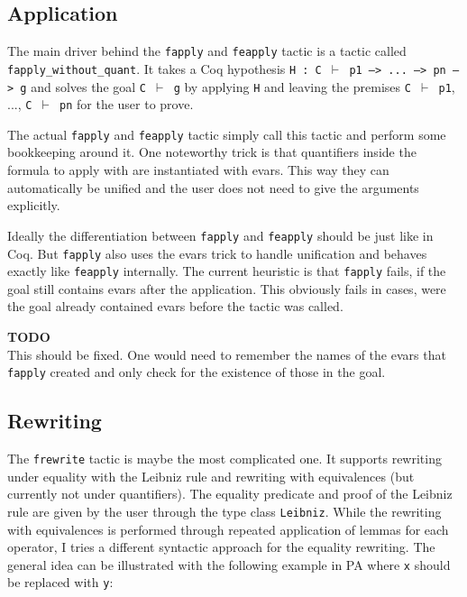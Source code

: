 \documentclass[12pt, a4paper]{article}
\newcommand{\improve}[1]{
	\vspace{3pt}
	\begin{boximprove}
		\parbox{\textwidth}{\textcolor{colorimprove}{\textbf{TODO}\\#1}}
	\end{boximprove}}
\begin{document}
\subsection{Application}

The main driver behind the \texttt{fapply} and \texttt{feapply} tactic is a tactic called \texttt{fapply\_without\_quant}.
It takes a Coq hypothesis \texttt{H : C $\vdash$ p1 --> ... --> pn --> g} and solves the goal \texttt{C $\vdash$ g} by applying \texttt{H} and leaving the premises \texttt{C $\vdash$ p1}, ..., \texttt{C $\vdash$ pn} for the user to prove.

The actual \texttt{fapply} and \texttt{feapply} tactic simply call this tactic and perform some bookkeeping around it.
One noteworthy trick is that quantifiers inside the formula to apply with are instantiated with evars.
This way they can automatically be unified and the user does not need to give the arguments explicitly.

\medskip\noindent
Ideally the differentiation between \texttt{fapply} and \texttt{feapply} should be just like in Coq.
But \texttt{fapply} also uses the evars trick to handle unification and behaves exactly like \texttt{feapply} internally.
The current heuristic is that \texttt{fapply} fails, if the goal still contains evars after the application.
This obviously fails in cases, were the goal already contained evars before the tactic was called.

\improve{This should be fixed. One would need to remember the names of the evars that \texttt{fapply} created and only check for the existence of those in the goal.}

\subsection{Rewriting}

The \texttt{frewrite} tactic is maybe the most complicated one.
It supports rewriting under equality with the Leibniz rule and rewriting with equivalences (but currently not under quantifiers).
The equality predicate and proof of the Leibniz rule are given by the user through the type class \texttt{Leibniz}.
While the rewriting with equivalences is performed through repeated application of lemmas for each operator, I tries a different syntactic approach for the equality rewriting.
The general idea can be illustrated with the following example in PA where \texttt{x} should be replaced with \texttt{y}:
\end{document}
